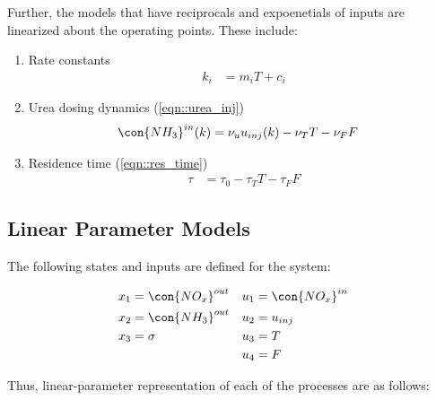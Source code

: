 Further, the models that have reciprocals and expoenetials of inputs are linearized about the operating points. These include:
\begin{enumerate}
    \item Rate constants
        \begin{align*}
            k_i &= m_i T + c_i
        \end{align*}
    \item Urea dosing dynamics (\ref{eqn::urea_inj})
        \begin{align*}
            \con{NH_3}^{in}(k) &= \nu_u u_{inj}(k) - \nu_T T - \nu_F F
        \end{align*}
    \item Residence time (\ref{eqn::res_time})
        \begin{align*}
            \tau &= \tau_0 - \tau_T T - \tau_F F
        \end{align*}
\end{enumerate}

\subsection{Linear Parameter Models}
The following states and inputs are defined for the system:

\begin{align*}
    x_1 &= \con{NO_x}^{out} & u_1 &= \con{NO_x}^{in} \\
    x_2 &= \con{NH_3}^{out} & u_2 &= u_{inj} \\
    x_3 &= \sigma & u_3 &= T\\
        &         & u_4 &= F
\end{align*}

Thus, linear-parameter representation of each of the processes are as follows:






